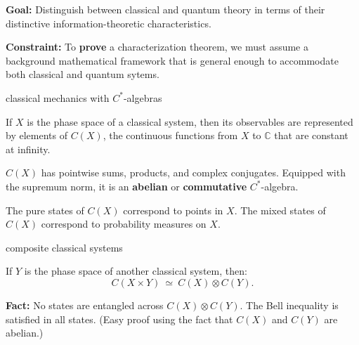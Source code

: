 \documentclass[8pt]{beamer}
\author{Hans Halvorson}
\date[November 2013]{November 12, 2013} \usetheme{Copenhagen}
\begin{document}
\def\2{\mathcal}
\def\7{\mathbb}
\newenvironment{proenv}{\only{\setbeamercolor{local structure}{fg=green}}}{}
\newenvironment{conenv}{\only{\setbeamercolor{local structure}{fg=red}}}{}  
\newenvironment{neuenv}{\only{\setbeamercolor{local
      structure}{fg=yellow}}}{}


\newcommand{\3}{\mathfrak}

\begin{frame}[plain]
  \titlepage
\end{frame}

\begin{frame}

  \textbf{Goal:} Distinguish between classical and quantum theory in
  terms of their distinctive information-theoretic characteristics.

  \bigskip \textbf{Constraint:} To \textbf{prove} a characterization
  theorem, we must assume a background mathematical framework that is
  general enough to accommodate both classical and quantum sytems.

\end{frame}

\begin{frame}{classical mechanics with $C^*$-algebras}

  If $X$ is the phase space of a classical system, then its
  observables are represented by elements of $C(X)$, the continuous
  functions from $X$ to $\7C$ that are constant at infinity.

  \bigskip $C(X)$ has pointwise sums, products, and complex
  conjugates.  Equipped with the supremum norm, it is an
  \textbf{abelian} or \textbf{commutative} $C^*$-algebra.

  \bigskip The pure states of $C(X)$ correspond to points in $X$.  The
  mixed states of $C(X)$ correspond to probability measures on $X$.

\end{frame}

\begin{frame}{composite classical systems}

If $Y$ is the phase space of another classical system, then:
$$ C(X\times Y) \: \simeq \: C(X)\otimes C(Y) .$$

\bigskip \textbf{Fact:} No states are entangled across $C(X)\otimes
C(Y)$.  The Bell inequality is satisfied in all states.  (Easy proof
using the fact that $C(X)$ and $C(Y)$ are abelian.)

\end{frame}
\end{document}
